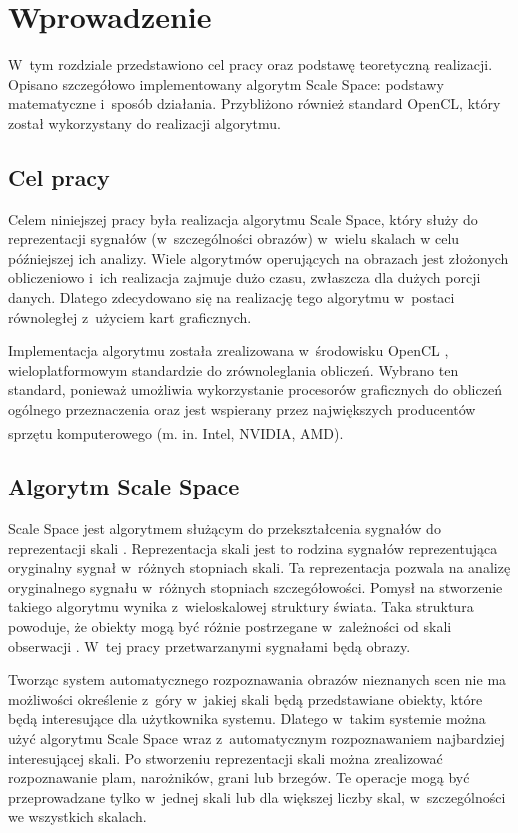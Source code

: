 \chapter{Wprowadzenie}
\label{cha:wprowadzenie}

W~tym rozdziale przedstawiono cel pracy oraz podstawę teoretyczną realizacji. Opisano szczegółowo implementowany algorytm Scale Space: podstawy matematyczne i~sposób działania. Przybliżono również standard OpenCL, który został wykorzystany do realizacji algorytmu.


\section{Cel pracy}
\label{sec:cel}
Celem niniejszej pracy była realizacja algorytmu Scale Space, który służy do reprezentacji sygnałów (w~szczególności obrazów) w~wielu skalach w celu późniejszej ich analizy.
Wiele algorytmów operujących na obrazach jest złożonych obliczeniowo i~ich realizacja zajmuje dużo czasu, zwłaszcza dla dużych porcji danych. Dlatego zdecydowano się na realizację tego algorytmu w~postaci równoległej z~użyciem kart graficznych.

Implementacja algorytmu została zrealizowana w~środowisku OpenCL \cite{OpenCL}, wieloplatformowym standardzie do zrównoleglania obliczeń. Wybrano ten standard, ponieważ umożliwia wykorzystanie procesorów graficznych do obliczeń ogólnego przeznaczenia oraz jest wspierany przez największych producentów sprzętu komputerowego (m. in. Intel\textsuperscript{\textregistered}, NVIDIA\textsuperscript{\texttrademark}, AMD).

\section{Algorytm Scale Space}
\label{sec:algorytm}
Scale Space jest algorytmem służącym do przekształcenia sygnałów do reprezentacji skali \cite{SSFramework}. Reprezentacja skali jest to rodzina sygnałów reprezentująca oryginalny sygnał w~różnych stopniach skali.
Ta reprezentacja pozwala na analizę oryginalnego sygnału w~różnych stopniach szczegółowości.
Pomysł na stworzenie takiego algorytmu wynika z~wieloskalowej struktury świata. Taka struktura powoduje, że obiekty mogą być różnie postrzegane w~zależności od skali obserwacji \cite{Enc09}.
W~tej pracy przetwarzanymi sygnałami będą obrazy.

Tworząc system automatycznego rozpoznawania obrazów nieznanych scen nie ma możliwości określenie z~góry w~jakiej skali będą przedstawiane obiekty, które będą interesujące dla użytkownika systemu. Dlatego w~takim systemie można użyć algorytmu Scale Space wraz z~automatycznym rozpoznawaniem najbardziej interesującej skali. Po stworzeniu reprezentacji skali można zrealizować rozpoznawanie plam, narożników, grani lub brzegów. Te operacje mogą być przeprowadzane tylko w~jednej skali lub dla większej liczby skal, w~szczególności we wszystkich skalach.

